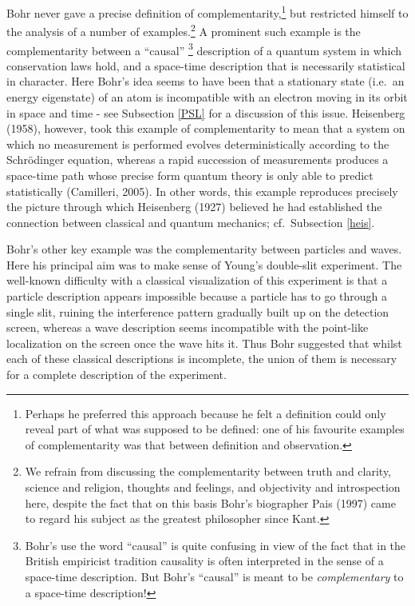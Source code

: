 \documentclass[12pt]{article}
\begin{document}
Bohr never gave a precise definition of complementarity,\footnote{Perhaps he preferred this approach because he felt a definition could only reveal part of what was supposed to be defined: one of his favourite examples of complementarity was that between definition and observation.} but restricted himself to the analysis of a number of examples.\footnote{We refrain from discussing the complementarity between truth and clarity, science and religion, thoughts and feelings, and objectivity and introspection here, despite the fact that on this basis Bohr's biographer Pais (1997) came to regard his subject as the greatest philosopher since Kant.}
A prominent such example is the complementarity between
a ``causal'' \footnote{\label{caudet} Bohr's use the word ``causal''  is quite confusing in view of the fact that in the British empiricist tradition causality is often interpreted in the sense of a space-time description. But Bohr's ``causal'' is meant to be {\it complementary} to a space-time description!}  description of a quantum system in which conservation laws hold, and a space-time description that is necessarily statistical in character. Here Bohr's  idea seems to have been that a stationary state (i.e.\ an energy eigenstate)  of an atom is incompatible with an electron moving in its orbit in space and time - see
Subsection \ref{PSL} for a discussion of this issue. Heisenberg (1958), however, took this example of complementarity to mean that 
a system on which no measurement is performed evolves 
deterministically according to the Schr\"{o}dinger equation, whereas  a rapid succession of measurements produces a space-time path whose precise form quantum theory is only able to predict statistically (Camilleri, 2005). In other words, this example reproduces precisely the picture through  which Heisenberg (1927) believed he had established the connection between classical and quantum mechanics; cf.\ Subsection \ref{heis}. 

Bohr's other key example was the complementarity between particles and waves. Here his principal  aim was to make sense of Young's double-slit experiment. The well-known difficulty with a classical visualization of this experiment is that a particle description appears  impossible because a particle has to go through a single slit, ruining the interference pattern gradually built up on the detection screen, whereas a wave description seems incompatible with the point-like localization on the screen once the wave hits it. Thus Bohr suggested that whilst each  of these classical descriptions is incomplete, the union of them is necessary for a complete description of the experiment.
\end{document}
